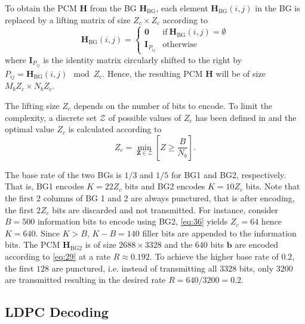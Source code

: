 \documentclass{article}
\def\0{\mathbf{0}}
\def\b{\mathbf{b}}
\def\H{\mathbf{H}}
\def\Hbg{\mathbf{H}_\mathrm{BG}}
\def\Hbgt{\mathbf{H}_\mathrm{BG2}}
\def\I{\mathbf{I}}
\def\Mb{{M_b}}
\def\Nb{{N_b}}
\def\Z{\mathbf{Z}}
\def\Zc{{Z_c}}
\begin{document}
To obtain the PCM $\H$ from the BG $\Hbg$, each element $\Hbg(i,j)$ in the BG is replaced by a lifting matrix of size $\Zc\times \Zc$ according to
\begin{equation}
  \label{eq:35}
  \Hbg(i,j) =
  \begin{cases}
    \0 & \textrm{if}~ \Hbg(i,j)=\emptyset \\
    \I_{P_{ij}} & \textrm{otherwise}
  \end{cases}
\end{equation}
where $\I_{P_{ij}}$ is the identity matrix circularly shifted to the right by $P_{ij} = \Hbg(i,j)\mod \Zc$. Hence, the resulting PCM $\H$ will be of size $\Mb\Zc\times\Nb\Zc$.

The lifting size $\Zc$ depends on the number of bits to encode. To limit the complexity, a discrete set $\mathcal{Z}$ of possible values of $\Zc$ has been defined in \cite{3gpp2017_38212} and the optimal value $\Zc$ is calculated according to
\begin{equation}
  \label{eq:36}
  \Zc = \min_{\Z\in\mathcal{Z}}\left[Z\geq\frac{B}{\Nb}\right].
\end{equation}

The base rate of the two BGs is $1/3$ and $1/5$ for BG1 and BG2, respectively. That is, BG1 encodes $K=22\Zc$ bits and BG2 encodes $K=10\Zc$ bits. Note that the first 2 columns of BG 1 and 2 are always punctured, that is after encoding, the first $2\Zc$ bits are discarded and not transmitted.
For instance, consider $B=500$ information bits to encode using BG2, \eqref{eq:36} yields $\Zc=64$ hence $K=640$. Since $K>B$, $K-B=140$ filler bits are appended to the information bits. The PCM $\Hbgt$ is of size $2688\times 3328$ and the $640$ bits $\b$ are encoded according to \eqref{eq:29} at a rate $R \approx 0.192$. To achieve the higher base rate of $0.2$, the first $128$ are punctured, i.e. instead of transmitting all $3328$ bits, only $3200$ are transmitted resulting in the desired rate $R=640/3200=0.2$.

\subsection{LDPC Decoding}
\label{sec:ldpc-decoding}
\end{document}
